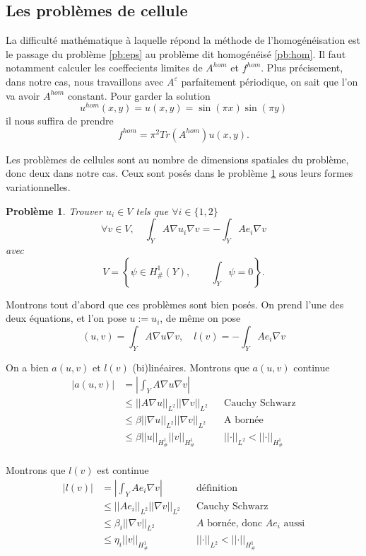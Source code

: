 \message{ !name(rapport.tex)}\documentclass[11pt]{article}
\newtheorem{pb}{Problème}
\newcommand{\Ah}{A^{hom}}
\newcommand{\uh}{u^{hom}}
\newcommand{\fh}{f^{hom}}
\newcommand{\norm}[1]{\left|\left|#1\right|\right|}
\newcommand{\Hd}{H^1_{\#}}
\begin{document}
\subsection{Les problèmes de cellule}

La difficulté mathématique à laquelle répond la méthode de l'homogénéisation est le passage du problème \ref{pb:eps} au problème dit homogénéisé
\ref{pb:hom}. Il faut notamment calculer les coeffecients limites de $\Ah$ et $\fh$. Plus précisement, dans notre cas, nous travaillons avec $A^\varepsilon$ parfaitement périodique,
on sait que l'on va avoir $\Ah$ constant. Pour garder la solution
\[
  \uh(x, y) = u(x, y) = \sin(\pi x)\sin(\pi y)
\]
il nous suffira de prendre
\[
  \fh = \pi^2 Tr(\Ah) u(x, y).
\]

Les problèmes de cellules sont au nombre de dimensions spatiales du problème, donc deux dans notre cas. Ceux sont posés dans le problème \ref{pb:cell} sous leurs
formes variationnelles.
\begin{pb}
  \label{pb:cell}
  Trouver $u_i \in V$ tels que $\forall i \in \{1,2\}$
  \begin{equation}
    \forall v \in V, \quad \int_Y A \nabla u_i \nabla v = - \int_Y A e_i \nabla v 
  \end{equation}
  avec
  \[
    V = 
    \left\{
      \psi \in \Hd(Y), \qquad \int_Y \psi = 0
    \right\}.
  \]
\end{pb}

Montrons tout d'abord que ces problèmes sont bien posés. On prend l'une des deux équations, et l'on pose $u:=u_i$, de même on pose
\[
  (u,v) = \int_Y A \nabla u \nabla v, \quad
  l(v) = -\int_Y A e_i \nabla v 
\]

On a bien $a(u,v)$ et $l(v)$ (bi)linéaires. Montrons que $a(u,v)$ continue 
\begin{align*}
  \big|a(u,v)\big| &= \left| \int_Y A \nabla u \nabla v \right| \\
                   &\leq \norm{A\nabla u}_{L^2} \norm{\nabla v}_{L^2} && \mbox{Cauchy Schwarz} \\
                   &\leq \beta \norm{\nabla u}_{L^2} \norm{\nabla v}_{L^2} && \mbox{A bornée} \\
                   &\leq \beta \norm{u}_{\Hd} \norm{v}_{\Hd} && \norm{\cdot}_{L^2}<\norm{\cdot}_{\Hd} \\
\end{align*}

Montrons que $l(v)$ est continue
\begin{align*}
  \big|l(v)\big| &= \left| \int_Y A e_i \nabla v \right|  && \text{définition} \\
                 &\leq \norm{Ae_i}_{L^2} \norm{\nabla v}_{L^2} && \text{Cauchy Schwarz} \\
                 &\leq \beta_i \norm{\nabla v}_{L^2} && \text{$A$ bornée, donc $A e_i$ aussi} \\
                 &\leq \eta_i \norm{v}_{\Hd} && \norm{\cdot}_{L^2}<\norm{\cdot}_{\Hd}
\end{align*}
\end{document}
